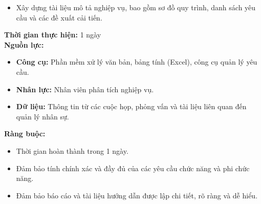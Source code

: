 {\begin{minipage}{\textwidth}
\begin{itemize}
        \item Xây dựng tài liệu mô tả nghiệp vụ, bao gồm sơ đồ quy trình, danh sách yêu cầu và các đề xuất cải tiến.
    \end{itemize}
    \vspace{0.5cm}
    \noindent \textbf{Thời gian thực hiện:} 1 ngày \\
    \noindent \textbf{Nguồn lực:}
    \begin{itemize}
        \item \textbf{Công cụ:} Phần mềm xử lý văn bản, bảng tính (Excel), công cụ quản lý yêu cầu.
        \item \textbf{Nhân lực:} Nhân viên phân tích nghiệp vụ.
        \item \textbf{Dữ liệu:} Thông tin từ các cuộc họp, phỏng vấn và tài liệu liên quan đến quản lý nhân sự.
    \end{itemize}
    \vspace{0.5cm}
    \noindent \textbf{Ràng buộc:}
    \begin{itemize}
        \item Thời gian hoàn thành trong 1 ngày.
        \item Đảm bảo tính chính xác và đầy đủ của các yêu cầu chức năng và phi chức năng.
        \item Đảm bảo báo cáo và tài liệu hướng dẫn được lập chi tiết, rõ ràng và dễ hiểu.
    \end{itemize}
    \end{minipage}
}

\newpage %

% 
